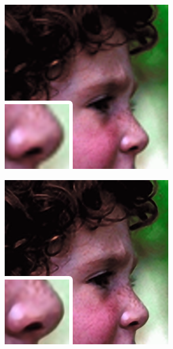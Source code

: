 \documentclass[
			fontsize = 12pt,
			paper = a4
			]
			{scrartcl}%
\newcommand{\?}{\ensuremath{^\texttt{\textbf [CITATION~NEEDED]}}}
\begin{document}
\begin{figure}[!ht]
\begin{subfigure}[b]{0.3\textwidth}
     \end{subfigure}
     \hfill
     \begin{subfigure}[b]{0.3\textwidth}
         \centering
         \includegraphics[width=\textwidth]{fig/examples/head_bicubic_x3}
     \end{subfigure}
     \hfill
     \begin{subfigure}[b]{0.3\textwidth}
         \centering
         \includegraphics[width=\textwidth]{fig/examples/head_srcnn_x3}

\end{subfigure}
\end{figure}
\end{document}
